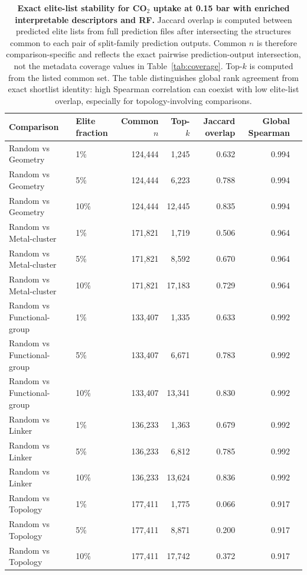 \documentclass[11pt,a4paper]{article}
\begin{document}
\begin{table}[H]
\centering
\caption{\textbf{Exact elite-list stability for CO$_2$ uptake at 0.15 bar with enriched interpretable descriptors and RF.} Jaccard overlap is computed between predicted elite lists from full prediction files after intersecting the structures common to each pair of split-family prediction outputs. Common $n$ is therefore comparison-specific and reflects the exact pairwise prediction-output intersection, not the metadata coverage values in Table~\ref{tab:coverage}. Top-$k$ is computed from the listed common set. The table distinguishes global rank agreement from exact shortlist identity: high Spearman correlation can coexist with low elite-list overlap, especially for topology-involving comparisons.}
\label{tab:elite_exact}
\scriptsize
\begin{tabular}{llrrrrr}
\toprule
Comparison & Elite fraction & Common $n$ & Top-$k$ & Jaccard overlap & Global Spearman \\
\midrule
Random vs Geometry & 1\% & 124,444 & 1,245 & 0.632 & 0.994 \\
Random vs Geometry & 5\% & 124,444 & 6,223 & 0.788 & 0.994 \\
Random vs Geometry & 10\% & 124,444 & 12,445 & 0.835 & 0.994 \\
Random vs Metal-cluster & 1\% & 171,821 & 1,719 & 0.506 & 0.964 \\
Random vs Metal-cluster & 5\% & 171,821 & 8,592 & 0.670 & 0.964 \\
Random vs Metal-cluster & 10\% & 171,821 & 17,183 & 0.729 & 0.964 \\
Random vs Functional-group & 1\% & 133,407 & 1,335 & 0.633 & 0.992 \\
Random vs Functional-group & 5\% & 133,407 & 6,671 & 0.783 & 0.992 \\
Random vs Functional-group & 10\% & 133,407 & 13,341 & 0.830 & 0.992 \\
Random vs Linker & 1\% & 136,233 & 1,363 & 0.679 & 0.992 \\
Random vs Linker & 5\% & 136,233 & 6,812 & 0.785 & 0.992 \\
Random vs Linker & 10\% & 136,233 & 13,624 & 0.836 & 0.992 \\
Random vs Topology & 1\% & 177,411 & 1,775 & 0.066 & 0.917 \\
Random vs Topology & 5\% & 177,411 & 8,871 & 0.200 & 0.917 \\
Random vs Topology & 10\% & 177,411 & 17,742 & 0.372 & 0.917 \\
\bottomrule
\end{tabular}
\end{table}
\end{document}
